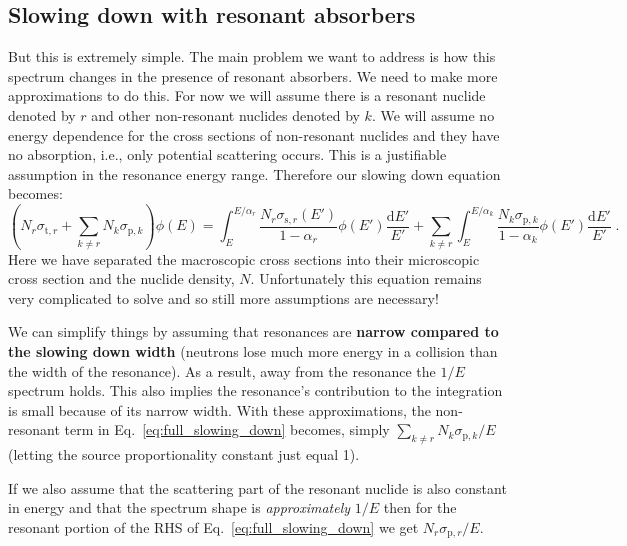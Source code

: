 \documentclass{article}
\begin{document}
\subsection{Slowing down with resonant absorbers}

But this is extremely simple. The main problem we want to address is how this spectrum changes in the presence of resonant absorbers. We need to make more approximations to do this. For now we will assume there is a resonant nuclide denoted by $r$ and other non-resonant nuclides denoted by $k$. We will assume no energy dependence for the cross sections of non-resonant nuclides and they have no absorption, i.e., only potential scattering occurs. This is a justifiable assumption in the resonance energy range. Therefore our slowing down equation becomes:
\begin{equation}\label{eq:full_slowing_down}
    \left(N_r\sigma_{\mathrm{t},r}+\sum_{k\neq r}N_k\sigma_{\mathrm{p},k}\right)\phi(E) = \int^{E/\alpha_r}_E \frac{N_r \sigma_{\mathrm{s},r}(E')}{1-\alpha_r}\phi(E')\frac{\mathrm{d}E'}{E'} + \sum_{k\neq r}\int^{E/\alpha_k}_E \frac{N_k \sigma_{\mathrm{p},k}}{1-\alpha_k}\phi(E')\frac{\mathrm{d}E'}{E'}\;\mathrm{.}
\end{equation}
Here we have separated the macroscopic cross sections into their microscopic cross section and the nuclide density, $N$. Unfortunately this equation remains very complicated to solve and so still more assumptions are necessary!

We can simplify things by assuming that resonances are \textbf{narrow compared to the slowing down width} (neutrons lose much more energy in a collision than the width of the resonance). As a result, away from the resonance the $1/E$ spectrum holds. This also implies the resonance's contribution to the integration is small because of its narrow width. With these approximations, the non-resonant term in Eq.~\eqref{eq:full_slowing_down} becomes, simply $\sum_{k\neq r}N_k\sigma_{\mathrm{p},k}/E$ (letting the source proportionality constant just equal 1).

If we also assume that the scattering part of the resonant nuclide is also constant in energy and that the spectrum shape is \textit{approximately} $1/E$ then for the resonant portion of the RHS of Eq.~\eqref{eq:full_slowing_down} we get $N_r\sigma_{\mathrm{p},r}/E$.
\end{document}
